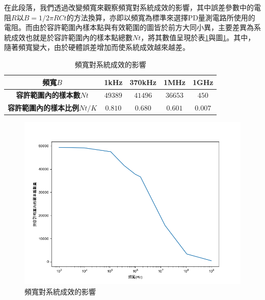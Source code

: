     在此段落，我們透過改變頻寬來觀察頻寬對系統成效的影響，其中誤差參數中的電阻$R$以$B=1/2\pi RCt$的方法換算，亦即以頻寬為標準來選擇PD量測電路所使用的電阻。而由於容許範圍內樣本點與有效範圍的圖皆於前方大同小異，主要差異為系統成效也就是於容許範圍內的樣本點總數$Nt$，將其數值呈現於表\ref{tab:bandwidth_effect}與圖\ref{pic:bandwidth_effect}。其中，隨著頻寬變大，由於硬體誤差增加而使系統成效越來越差。

    \begin{table}[htpb]
        \begin{center}
          \caption{頻寬對系統成效的影響}
          \label{tab:bandwidth_effect}
          \begin{tabular}{|c||c|c|c|c|} %
            \hline  
           \textbf{頻寬$B$} &
           1kHz&
           370kHz &
           1MHz&
           1GHz
           \\\hline\hline


           \textbf{容許範圍內的樣本數$Nt$} &
           $49389$&
           $41496$&
           $36653$&
           $450$
           \\\hline

           \textbf{容許範圍內的樣本比例$Nt/K$} &
           $0.810$&
           $0.680$&
           $0.601$&
           $0.007$
           \\\hline
         \end{tabular}
       \end{center}
     \end{table}
    
     \begin{figure}[htpb]
        \centering
        \includegraphics[width=15cm]{ch4pic/bandwidth_effect.png}
        \caption{頻寬對系統成效的影響}
        \label{pic:bandwidth_effect}
    \end{figure}




